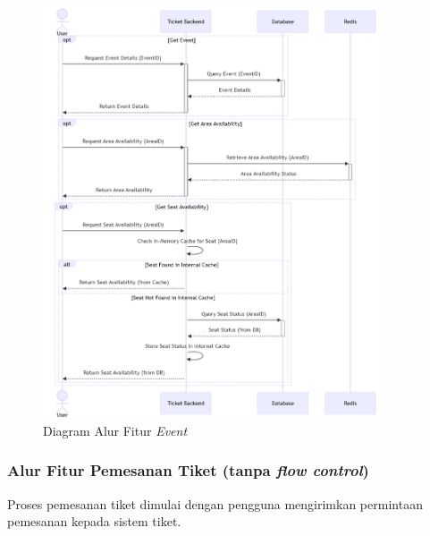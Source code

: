 \begin{figure}[h]
    \centering
    \includegraphics[width=0.9\textwidth]{resources/chapter-3/event-flow.png}
    \caption{Diagram Alur Fitur \textit{Event}}
    \label{fig:flow-event}
\end{figure}

\pagebreak

\subsubsection{Alur Fitur Pemesanan Tiket (tanpa \textit{flow control})}

Proses pemesanan tiket dimulai dengan pengguna mengirimkan permintaan pemesanan kepada sistem tiket.

